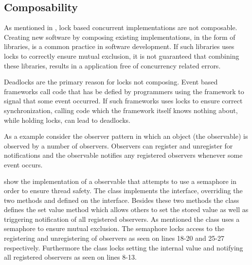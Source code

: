 
\subsection{Composability}\label{subsec:tl_composability}
As mentioned in , lock based concurrent implementations are not composable. Creating new software by composing existing implementations, in the form of libraries, is a common practice in software development. If such libraries uses locks to correctly ensure mutual exclusion, it is not guaranteed that combining these libraries, results in a application free of concurrency related errors.

Deadlocks are the primary reason for locks not composing\cite[p. 58]{sutter2005software}. Event based frameworks call code that has be defied by programmers using the framework to signal that some event occurred. If such frameworks uses locks to ensure correct synchronization, calling code which the framework itself knows nothing about, while holding locks, can lead to deadlocks.

As a example consider the observer pattern\cite{gamma1994design} in which an object (the observable) is observed by a number of observers. Observers can register and unregister for notifications and the observable notifies any registered observers whenever some event occurs. 

 show the implementation of a observable that attempts to use a semaphore in order to ensure thread safety. The  class implements the  interface, overriding the two methods  and  defined on the interface. Besides these two methods the   class defines the set value method which allows others to set the stored value as well as triggering notification of all registered observers. As mentioned the  class uses a semaphore to ensure mutual exclusion. The semaphore locks access to the registering and unregistering of observers as seen on lines 18-20 and 25-27 respectively. Furthermore the  class locks setting the internal value and notifying all registered observers as seen on lines 8-13.

